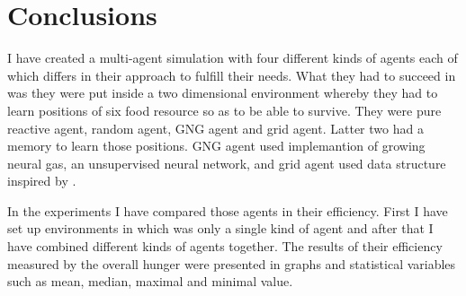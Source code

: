 \chapter*{Conclusions}

I have created a multi-agent simulation with four different kinds of agents each of which differs in their approach to fulfill their needs. What they had to succeed in was they were put inside a two dimensional environment whereby they had to learn positions of six food resource so as to be able to survive. They were pure reactive agent, random agent, GNG agent and grid agent. Latter two had a memory to learn those positions. GNG agent used implemantion of growing neural gas, an unsupervised neural network, and grid agent used data structure inspired by \cite{Brom:placeandobjects}.

In the experiments I have compared those agents in their efficiency. First I have set up environments in which was only a single kind of agent and after that I have combined different kinds of agents together. The results of their efficiency measured by the overall hunger were presented in graphs and statistical variables such as mean, median, maximal and minimal value. 


 